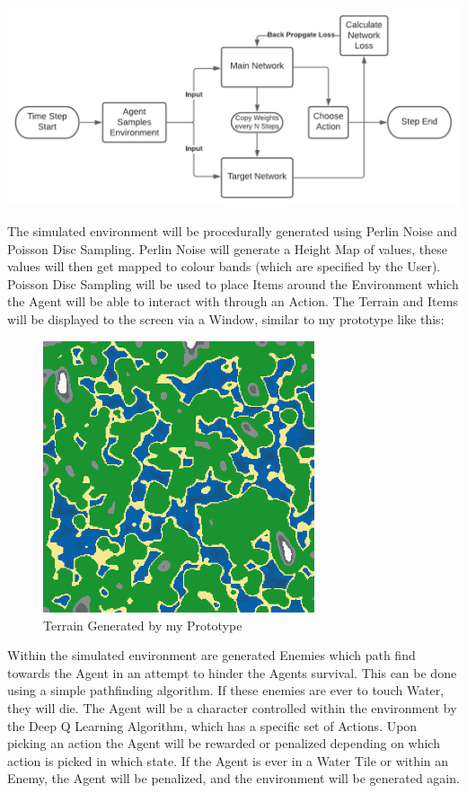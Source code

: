 \begin{flushleft}
            \vspace{0.5cm}
            \centerline{\includegraphics[width=\textwidth]{Images/Design/DualNetwork.png}}
            \vspace{0.5cm}

            The simulated environment will be procedurally generated using Perlin Noise and Poisson Disc Sampling. Perlin Noise will
            generate a Height Map of values, these values will then get mapped to colour bands (which are specified by the User). Poisson
            Disc Sampling will be used to place Items around the Environment which the Agent will be able to interact with through an Action.
            The Terrain and Items will be displayed to the screen via a Window, similar to my prototype like this: \\

            \begin{figure}[H]
                \centering
                \includegraphics[width=8cm]{Images/Prototype/Seed420 Colour.png}
                \caption*{Terrain Generated by my Prototype}
            \end{figure}

            Within the simulated environment are generated Enemies which path find towards the Agent in an attempt to hinder the Agents
            survival. This can be done using a simple pathfinding algorithm. If these enemies are ever to touch Water, they will die. 
            The Agent will be a character controlled within the environment by the Deep Q Learning Algorithm, which has a specific set
            of Actions. Upon picking an action the Agent will be rewarded or penalized depending on which action is picked in which state. If the
            Agent is ever in a Water Tile or within an Enemy, the Agent will be penalized, and the environment will be generated again.


\end{flushleft}

